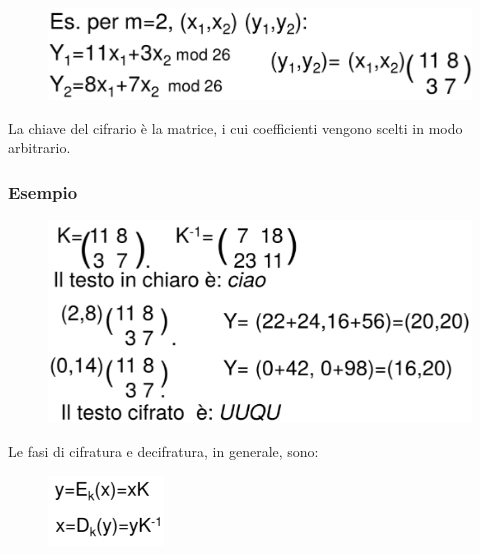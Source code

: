\begin{figure}[H]
    \centering 
    \includegraphics[width=0.8\linewidth]{chapters/chap02/images/hill.png}
\end{figure}

La chiave del cifrario è la matrice, i cui coefficienti vengono scelti in modo arbitrario.

\subsubsection{Esempio}

\begin{figure}[H]
    \centering 
    \includegraphics[width=0.8\linewidth]{chapters/chap02/images/hill2.png}
\end{figure}

\noindent Le fasi di cifratura e decifratura, in generale, sono:

\begin{figure}[H]
    \centering 
    \includegraphics[width=0.8\linewidth]{chapters/chap02/images/hill3.png}
\end{figure}


